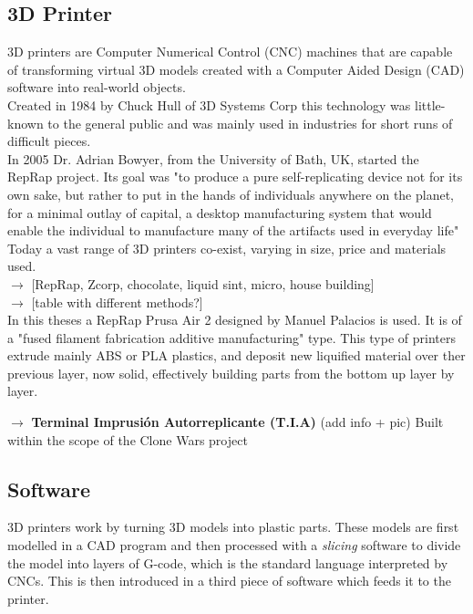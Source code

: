\subsection{3D Printer}

	3D printers are Computer Numerical Control (CNC) machines that are capable of transforming virtual 3D models created with a Computer Aided Design (CAD) software into real-world objects.\\

	Created in 1984 by Chuck Hull of 3D Systems Corp this technology was little-known to the general public and was mainly used in industries for short runs of difficult pieces.\\
	In 2005 Dr. Adrian Bowyer, from the University of Bath, UK, started the RepRap project. Its goal was "to produce a pure self-replicating device not for its own sake, but rather to put in the hands of individuals anywhere on the planet, for a minimal outlay of capital, a desktop manufacturing system that would enable the individual to manufacture many of the artifacts used in everyday life" \\

	Today a vast range of 3D printers co-exist, varying in size, price and materials used. \\


	$\rightarrow$ [RepRap, Zcorp, chocolate, liquid sint, micro, house building]\\

	$\rightarrow$ [table with different methods?]\\

	In this theses a RepRap Prusa Air 2 designed by Manuel Palacios is used. It is of a "fused filament fabrication additive manufacturing" type. This type of printers extrude mainly ABS or PLA plastics, and deposit new liquified material over ther previous layer, now solid, effectively building parts from the bottom up layer by layer.

	$\rightarrow$ \textbf {Terminal Imprusión Autorreplicante (T.I.A) }
	(add info + pic)
	Built within the scope of the Clone Wars project



\subsection{Software}
	3D printers work by turning 3D models into plastic parts. These models are first modelled in a CAD program and then processed with a \textit{slicing} software to divide the model into layers of G-code, which is the standard language interpreted by CNCs. This is then introduced in a third piece of software which feeds it to the printer.

